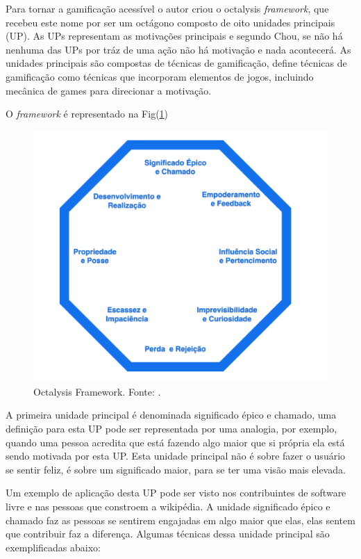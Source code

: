 Para tornar a gamificação acessível o autor criou o octalysis \textit{framework}, que recebeu este nome por ser um octágono composto de oito unidades principais (UP). As UPs representam as motivações principais e segundo Chou, se não há nenhuma das UPs por tráz de uma ação não há motivação e nada acontecerá. As unidades principais são compostas de técnicas de gamificação, \cite{chou2015actionable} define técnicas de gamificação como técnicas que incorporam elementos de jogos, incluindo mecânica de games para direcionar a motivação.

 O \textit{framework} é representado na Fig(\ref{octfig})

\begin{figure}[h]
	\centering
		\includegraphics[keepaspectratio=true,scale=0.5]{figuras/octfig.png}
	\caption{Octalysis Framework. Fonte:  \cite{chou2015actionable}.\label{octfig}
}
\end{figure}

\newpage

A primeira unidade principal é denominada significado épico e chamado, uma definição para esta UP pode ser representada por uma analogia, por exemplo, quando uma pessoa acredita que está fazendo algo maior que si própria ela está sendo motivada por esta UP. Esta unidade principal não é sobre fazer o usuário se sentir feliz, é sobre um significado maior, para se ter uma visão mais elevada. 

Um exemplo de aplicação desta UP pode ser visto nos contribuintes de software livre e nas pessoas que constroem a wikipédia. A unidade significado épico e chamado faz as pessoas se sentirem engajadas em algo maior que elas, elas sentem que contribuir faz a diferença. Algumas técnicas dessa unidade principal são exemplificadas abaixo:

